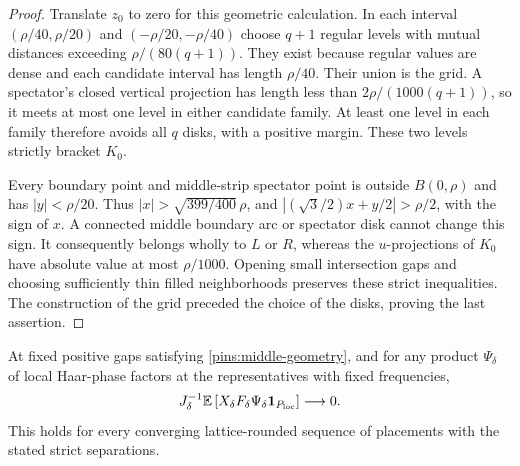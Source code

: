 \begin{proof}
Translate $z_0$ to zero for this geometric calculation.  In each
interval $(\rho/40,\rho/20)$ and $(-\rho/20,-\rho/40)$ choose
$q+1$ regular levels with mutual distances exceeding
$\rho/(80(q+1))$.  They exist because regular values are dense
and each candidate interval has length $\rho/40$.  Their union is
the grid.  A spectator's closed vertical projection has length less
than $2\rho/(1000(q+1))$, so it meets at most one level in either
candidate family.  At least one level in each family therefore
avoids all $q$ disks, with a positive margin.  These two levels
strictly bracket $K_0$.

Every boundary point and middle-strip spectator point is outside
$B(0,\rho)$ and has $|y|<\rho/20$.  Thus
$|x|>\sqrt{399/400}\,\rho$, and
$|(\sqrt3/2)x+y/2|>\rho/2$, with the sign of $x$.
A connected middle boundary arc or spectator disk cannot change this
sign.  It consequently belongs wholly to $L$ or $R$, whereas the
$u$-projections of $K_0$ have absolute value at most $\rho/1000$.
Opening small intersection gaps and choosing sufficiently thin filled
neighborhoods preserves these strict inequalities.  The construction
of the grid preceded the choice of the disks, proving the last assertion.
\end{proof}

\begin{lemma}\label{pins:three-moves}
At fixed positive gaps satisfying \eqref{pins:middle-geometry}, and for
any product $\Psi_\delta$ of local Haar-phase factors at the
representatives with fixed frequencies,
\begin{equation}\label{pins:separated-identity}
 J_\delta^{-1}\mathbb E\left[
 X_\delta F_\delta\Psi_\delta\mathbf 1_{P_{\mathrm{loc}}}\right]
 \longrightarrow0.
\end{equation}
This holds for every converging lattice-rounded sequence of placements
with the stated strict separations.
\end{lemma}

